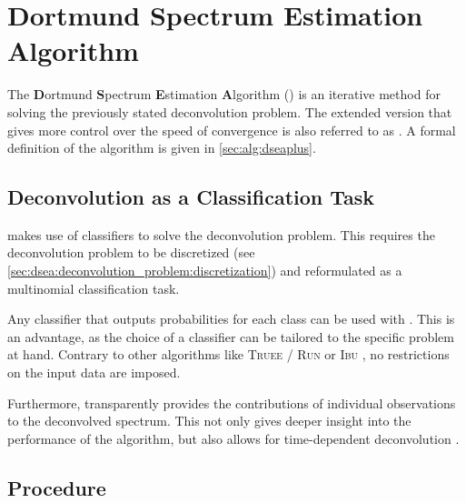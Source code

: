 \section{Dortmund Spectrum Estimation Algorithm} \label{sec:dsea:dsea}
The \textbf{D}ortmund \textbf{S}pectrum \textbf{E}stimation \textbf{A}lgorithm
  (\dsea{})
  \cite{dsea_unification}
is an iterative method for solving the previously stated deconvolution problem.
The extended version \cite{dsea_mirko}
  that
    gives more control over the speed of convergence
is also referred to as \dseaplus{}.
%
A formal definition of the \dseaplus{} algorithm is given in \autoref{sec:alg:dseaplus}.


\subsection{Deconvolution as a Classification Task} %
\dsea{} makes use of classifiers to solve the deconvolution problem.
This requires the deconvolution problem to be
  discretized (see \autoref{sec:dsea:deconvolution_problem:discretization})
  and reformulated as a multinomial classification task.

Any classifier that outputs probabilities for each class
  can be used with \dsea{}.
This is an advantage,
  as the choice of a classifier can be tailored to the specific problem at hand.
Contrary to other algorithms like
  \textsc{Truee} / \textsc{Run} \cite{milke2013} or
  \textsc{Ibu} \cite{dagostini1995, dagostini2010},
no restrictions on the input data are imposed.

Furthermore,
\dsea{} transparently provides the contributions of individual observations to the deconvolved spectrum.
This not only gives deeper insight into the performance of the algorithm,
but also allows for time-dependent deconvolution \cite{dsea_mirko}. %


\clearpage %
\subsection{Procedure}




